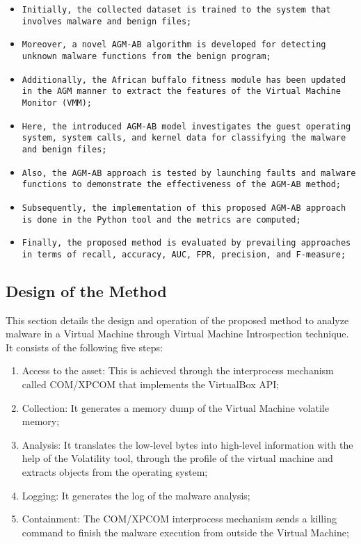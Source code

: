 \documentclass[acmtog]{acmart}
\begin{document}
\begin{itemize}
\item {\texttt{Initially, the collected dataset is trained to the system that involves malware and benign files; }}
\item {\texttt{Moreover, a novel AGM-AB algorithm is developed for detecting unknown malware functions from the benign program;}}
\item {\texttt{Additionally, the African buffalo fitness module has been updated in the AGM manner to extract the features of the Virtual Machine Monitor (VMM);}}
\item {\texttt{Here, the introduced AGM-AB model investigates the guest operating system, system calls, and kernel data for classifying the malware and benign files;}}
\item {\texttt{Also, the AGM-AB approach is tested by launching faults and malware functions to demonstrate the effectiveness of the AGM-AB method;}}
\item {\texttt{Subsequently, the implementation of this proposed AGM-AB approach is done in the Python tool and the metrics are computed;}}
\item {\texttt{Finally, the proposed method is evaluated by prevailing approaches in terms of recall, accuracy, AUC, FPR, precision, and F-measure;}}
\end{itemize}

\subsection{Design of the Method}
This section details the design and operation of the proposed method to analyze malware in a Virtual Machine through Virtual Machine Introspection technique. It consists of the following five steps: 
\begin{enumerate} 
  \item Access to the asset: This is achieved through the interprocess mechanism called COM/XPCOM that implements the VirtualBox API;
  \item Collection: It generates a memory dump of the Virtual Machine volatile memory;
  \item Analysis: It translates the low-level bytes into high-level information with the help of the Volatility tool, through the profile of the virtual machine and extracts objects from the operating system;
  \item Logging: It generates the log of the malware analysis;
  \item Containment: The COM/XPCOM interprocess mechanism sends a killing command to finish the malware execution from outside the Virtual Machine;
\end{enumerate}
\end{document}
